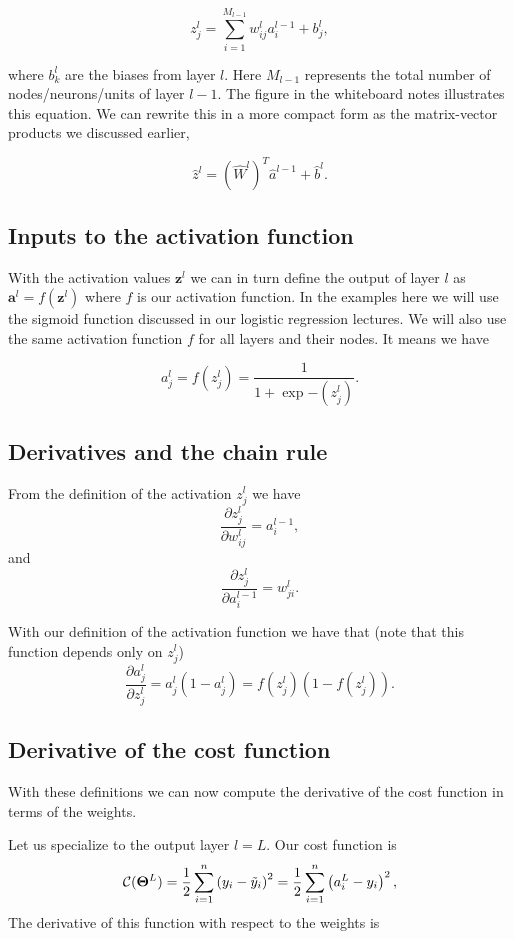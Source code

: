 \documentclass[%
oneside,                 %
final,                   %
10pt]{article}
\begin{document}
\[
z_j^l = \sum_{i=1}^{M_{l-1}}w_{ij}^la_i^{l-1}+b_j^l,
\]

where $b_k^l$ are the biases from layer $l$.  Here $M_{l-1}$
represents the total number of nodes/neurons/units of layer $l-1$. The
figure in the whiteboard notes illustrates this equation.  We can rewrite this in a more
compact form as the matrix-vector products we discussed earlier,

\[
\hat{z}^l = \left(\hat{W}^l\right)^T\hat{a}^{l-1}+\hat{b}^l.
\]

\subsection{Inputs to the activation function}

With the activation values $\bm{z}^l$ we can in turn define the
output of layer $l$ as $\bm{a}^l = f(\bm{z}^l)$ where $f$ is our
activation function. In the examples here we will use the sigmoid
function discussed in our logistic regression lectures. We will also use the same activation function $f$ for all layers
and their nodes.  It means we have

\[
a_j^l = f(z_j^l) = \frac{1}{1+\exp{-(z_j^l)}}.
\]

\subsection{Derivatives and the chain rule}

From the definition of the activation $z_j^l$ we have
\[
\frac{\partial z_j^l}{\partial w_{ij}^l} = a_i^{l-1},
\]
and
\[
\frac{\partial z_j^l}{\partial a_i^{l-1}} = w_{ji}^l. 
\]

With our definition of the activation function we have that (note that this function depends only on $z_j^l$)
\[
\frac{\partial a_j^l}{\partial z_j^{l}} = a_j^l(1-a_j^l)=f(z_j^l)(1-f(z_j^l)). 
\]

\subsection{Derivative of the cost function}

With these definitions we can now compute the derivative of the cost function in terms of the weights.

Let us specialize to the output layer $l=L$. Our cost function is
\[
{\cal C}(\bm{\Theta}^L)  =  \frac{1}{2}\sum_{i=1}^n\left(y_i - \tilde{y}_i\right)^2=\frac{1}{2}\sum_{i=1}^n\left(a_i^L - y_i\right)^2, 
\]
The derivative of this function with respect to the weights is
\end{document}
